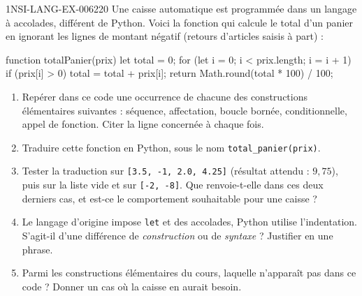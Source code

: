 \begin{exercice}{1NSI-LANG-EX-006}{2}{20}
Une caisse automatique est programmée dans un langage à accolades, différent de
Python. Voici la fonction qui calcule le total d'un panier en ignorant les
lignes de montant négatif (retours d'articles saisis à part) :
\begin{console}
function totalPanier(prix) {
    let total = 0;
    for (let i = 0; i < prix.length; i = i + 1) {
        if (prix[i] > 0) {
            total = total + prix[i];
        }
    }
    return Math.round(total * 100) / 100;
}
\end{console}
\begin{enumerate}
  \item Repérer dans ce code une occurrence de chacune des constructions
    élémentaires suivantes : séquence, affectation, boucle bornée,
    conditionnelle, appel de fonction. Citer la ligne concernée à chaque fois.
  \item Traduire cette fonction en Python, sous le nom
    \lstinline{total_panier(prix)}.
  \item Tester la traduction sur \lstinline{[3.5, -1, 2.0, 4.25]} (résultat
    attendu : $9{,}75$), puis sur la liste vide et sur
    \lstinline{[-2, -8]}. Que renvoie-t-elle dans ces deux derniers cas, et
    est-ce le comportement souhaitable pour une caisse ?
  \item Le langage d'origine impose \lstinline{let} et des accolades, Python
    utilise l'indentation. S'agit-il d'une différence de \emph{construction} ou
    de \emph{syntaxe} ? Justifier en une phrase.
  \item Parmi les constructions élémentaires du cours, laquelle n'apparaît pas
    dans ce code ? Donner un cas où la caisse en aurait besoin.
\end{enumerate}
\end{exercice}
